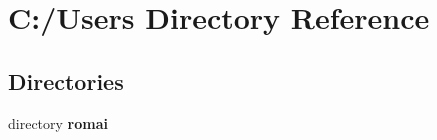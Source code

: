 \section{C\+:/\+Users Directory Reference}
\label{dir_d522931ffa1371640980b621734a4381}
\subsection*{Directories}
\begin{DoxyCompactItemize}
\item 
directory \textbf{ romai}
\end{DoxyCompactItemize}
